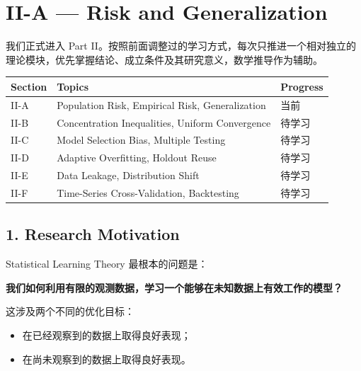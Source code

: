 \hypertarget{part-2-12-0001-ii-a-risk-and-generalization}{%
\section{II-A --- Risk and Generalization}\label{part-2-12-0001-ii-a-risk-and-generalization}}

我们正式进入 Part II。按照前面调整过的学习方式，每次只推进一个相对独立的理论模块，优先掌握结论、成立条件及其研究意义，数学推导作为辅助。

\begin{readertable}
\begin{longtable}[]{@{}
  >{\raggedright\arraybackslash}p{}
  >{\raggedright\arraybackslash}p{}
  >{\raggedright\arraybackslash}p{}@{}}
\toprule
Section & Topics & Progress \\
\midrule
\endhead
II-A & Population Risk, Empirical Risk, Generalization & 当前 \\
II-B & Concentration Inequalities, Uniform Convergence & 待学习 \\
II-C & Model Selection Bias, Multiple Testing & 待学习 \\
II-D & Adaptive Overfitting, Holdout Reuse & 待学习 \\
II-E & Data Leakage, Distribution Shift & 待学习 \\
II-F & Time-Series Cross-Validation, Backtesting & 待学习 \\
\bottomrule
\end{longtable}
\end{readertable}

\hypertarget{part-2-12-0001-research-motivation}{%
\subsection{1. Research Motivation}\label{part-2-12-0001-research-motivation}}

Statistical Learning Theory 最根本的问题是：

\textbf{我们如何利用有限的观测数据，学习一个能够在未知数据上有效工作的模型？}

这涉及两个不同的优化目标：

\begin{itemize}
\tightlist
\item
  在已经观察到的数据上取得良好表现；
\item
  在尚未观察到的数据上取得良好表现。
\end{itemize}

